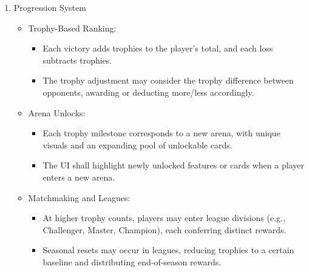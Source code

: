 \documentclass{article}
\begin{document}
\begin{enumerate}[label=\textbf{FR\arabic*:}]
    \item Progression System
    \begin{itemize}
        \item Trophy-Based Ranking:
        \begin{itemize}
            \item Each victory adds trophies to the player's total, and each loss subtracts trophies.
            \item The trophy adjustment may consider the trophy difference between opponents, awarding or deducting more/less accordingly.
        \end{itemize}
        \item Arena Unlocks:
        \begin{itemize}
            \item Each trophy milestone corresponds to a new arena, with unique visuals and an expanding pool of unlockable cards.
            \item The UI shall highlight newly unlocked features or cards when a player enters a new arena.
        \end{itemize}
        \item Matchmaking and Leagues:
        \begin{itemize}
            \item At higher trophy counts, players may enter league divisions (e.g., Challenger, Master, Champion), each conferring distinct rewards.
            \item Seasonal resets may occur in leagues, reducing trophies to a certain baseline and distributing end-of-season rewards.
        \end{itemize}
    \end{itemize}
    

\end{enumerate}
\end{document}

